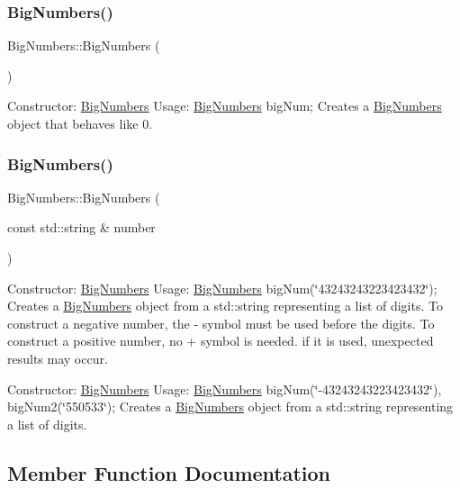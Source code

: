 \subsubsection{\texorpdfstring{Big\+Numbers()}{BigNumbers()}\hspace{0.1cm}{\footnotesize\ttfamily [1/2]}}
{\footnotesize\ttfamily Big\+Numbers\+::\+Big\+Numbers (\begin{DoxyParamCaption}{ }\end{DoxyParamCaption})}

Constructor\+: \mbox{\hyperlink{class_big_numbers}{Big\+Numbers}} Usage\+: \mbox{\hyperlink{class_big_numbers}{Big\+Numbers}} big\+Num; Creates a \mbox{\hyperlink{class_big_numbers}{Big\+Numbers}} object that behaves like 0. \mbox{\label{class_big_numbers_a7aca99911efb6981ac70f1514e8f2a5e}} 
\subsubsection{\texorpdfstring{Big\+Numbers()}{BigNumbers()}\hspace{0.1cm}{\footnotesize\ttfamily [2/2]}}
{\footnotesize\ttfamily Big\+Numbers\+::\+Big\+Numbers (\begin{DoxyParamCaption}\item[{const std\+::string \&}]{number }\end{DoxyParamCaption})}

Constructor\+: \mbox{\hyperlink{class_big_numbers}{Big\+Numbers}} Usage\+: \mbox{\hyperlink{class_big_numbers}{Big\+Numbers}} big\+Num(\char`\"{}43243243223423432\char`\"{}); Creates a \mbox{\hyperlink{class_big_numbers}{Big\+Numbers}} object from a std\+::string representing a list of digits. To construct a negative number, the \textquotesingle{}-\/\textquotesingle{} symbol must be used before the digits. To construct a positive number, no \textquotesingle{}+\textquotesingle{} symbol is needed. if it is used, unexpected results may occur.

Constructor\+: \mbox{\hyperlink{class_big_numbers}{Big\+Numbers}} Usage\+: \mbox{\hyperlink{class_big_numbers}{Big\+Numbers}} big\+Num(\char`\"{}-\/43243243223423432\char`\"{}), big\+Num2(\char`\"{}550533\char`\"{}); Creates a \mbox{\hyperlink{class_big_numbers}{Big\+Numbers}} object from a std\+::string representing a list of digits. 

\subsection{Member Function Documentation}
\mbox{\label{class_big_numbers_a72014485e13fae1c0711f4fd6628392a}} 

